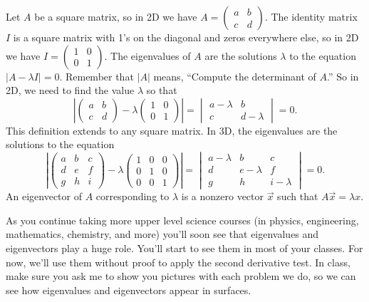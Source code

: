 \begin{definition}
 Let $A$ be a square matrix, so in 2D we have $A=\begin{pmatrix} a&b\\c&d \end{pmatrix}$. The identity matrix $I$ is a square matrix with 1's on the diagonal and zeros everywhere else, so in 2D we have $I = \begin{pmatrix} 1&0\\0&1 \end{pmatrix}$. The eigenvalues of $A$ are the solutions $\lambda$ to the equation $|A-\lambda I|=0$. Remember that $|A|$ means, ``Compute the determinant of $A$.'' So in 2D, we need to find the value $\lambda$ so that 
 $$\left|\begin{pmatrix} a&b\\c&d\end{pmatrix}-\lambda  \begin{pmatrix} 1&0\\0&1 \end{pmatrix} \right|=\begin{vmatrix} a-\lambda &b\\c&d-\lambda \end{vmatrix}=0.$$
 This definition extends to any square matrix.  In 3D, the eigenvalues are the solutions to the equation
 $$\left|\begin{pmatrix} a&b&c\\d&e&f\\g&h&i\end{pmatrix}-\lambda 
\begin{pmatrix} 1&0&0\\0&1&0\\0&0&1\end{pmatrix} \right| = 
           \begin{vmatrix} a-\lambda&b&c\\d&e-\lambda&f\\g&h&i-\lambda\end{vmatrix}=0.$$
 An eigenvector of $A$ corresponding to $\lambda$ is a nonzero vector $\vec x$ such that $A\vec x=\lambda x$. 
\end{definition}

As you continue taking more upper level science courses (in physics, engineering, mathematics, chemistry, and more) you'll soon see that eigenvalues and eigenvectors play a huge role.  You'll start to see them in most of your classes. For now, we'll use them without proof to apply the second derivative test. In class, make sure you ask me to show you pictures with each problem we do, so we can see how eigenvalues and eigenvectors appear in surfaces.

